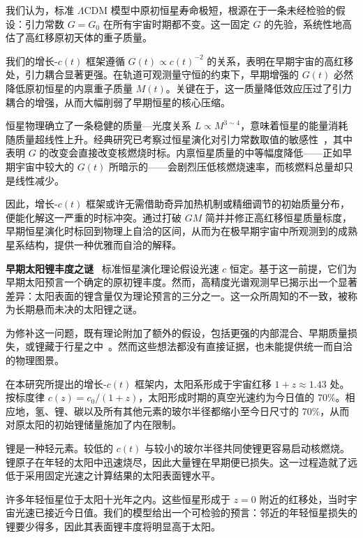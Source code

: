 \documentclass[12pt,leqno]{article}
\begin{document}
	\medskip
	我们认为，标准 $\Lambda$CDM 模型中原初恒星寿命极短，根源在于一条未经检验的假设：引力常数 $G=G_0$ 在所有宇宙时期都不变。这一固定 $G$ 的先验，系统性地高估了高红移原初天体的重子质量。
	
	\medskip
	我们的增长-$c(t)$ 框架遵循 $G(t)\propto c(t)^{-2}$ 的关系，表明在早期宇宙的高红移处，引力耦合显著更强。在轨道可观测量守恒的约束下，早期增强的 $G(t)$ 必然降低原初恒星的内禀重子质量 $M(t)$。关键在于，这一质量降低效应压过了引力耦合的增强，从而大幅削弱了早期恒星的核心压缩。
	
	\medskip
	恒星物理确立了一条稳健的质量—光度关系 $L\propto M^{3\sim4}$，意味着恒星的能量消耗随质量超线性上升。经典研究已考察过恒星演化对引力常数取值的敏感性~\cite{Prather:1976}，其中表明 $G$ 的改变会直接改变核燃烧时标。内禀恒星质量的中等幅度降低——正如早期宇宙中较大的 $G(t)$ 所暗示的——会剧烈压低核燃烧速率，而核燃料总量却只是线性减少。
	
	\medskip
	因此，增长-$c(t)$ 框架或许无需借助奇异加热机制或精细调节的初始质量分布，便能化解这一严重的时标冲突。通过打破 $GM$ 简并并修正高红移恒星质量标度，早期恒星演化时标回到物理上自洽的区间，从而为在极早期宇宙中所观测到的成熟星系结构，提供一种优雅而自洽的解释。
	
	
	

	\medskip
	\bigskip
	\textbf{早期太阳锂丰度之谜}\,\,\,
	标准恒星演化理论假设光速 $c$ 恒定。基于这一前提，它们为早期太阳预言一个确定的原初锂丰度。然而，高精度光谱观测早已揭示出一个显著差异：太阳表面的锂含量仅为理论预言的三分之一。这一众所周知的不一致，被称为长期悬而未决的太阳锂之谜。
	
	\medskip
	为修补这一问题，既有理论附加了额外的假设，包括更强的内部混合、早期质量损失，或锂藏于行星之中~\cite{Korn:2019}。然而这些想法都没有直接证据，也未能提供统一而自洽的物理图景。
	
	\medskip
	在本研究所提出的增长-$c(t)$ 框架内，太阳系形成于宇宙红移 $1+z\approx1.43$ 处。按标度律 $c(z)=c_0/(1+z)$，太阳形成时期的真空光速约为今日值的 70\%。相应地，氢、锂、碳以及所有其他元素的玻尔半径都缩小至今日尺寸的 70\%，从而对原太阳的初始锂储量施加了内在限制。
	
	\medskip
	锂是一种轻元素。较低的 $c(t)$ 与较小的玻尔半径共同使锂更容易启动核燃烧。锂原子在年轻的太阳中迅速烧尽，因此大量锂在早期便已损失。这一过程造就了远低于采用固定光速之计算结果的太阳表面锂水平。
	
	\medskip
	许多年轻恒星位于太阳十光年之内。这些恒星形成于 $z=0$ 附近的红移处，当时宇宙光速已接近今日值。我们的模型给出一个可检验的预言：邻近的年轻恒星损失的锂要少得多，因此其表面锂丰度将明显高于太阳。
	
\end{document}
